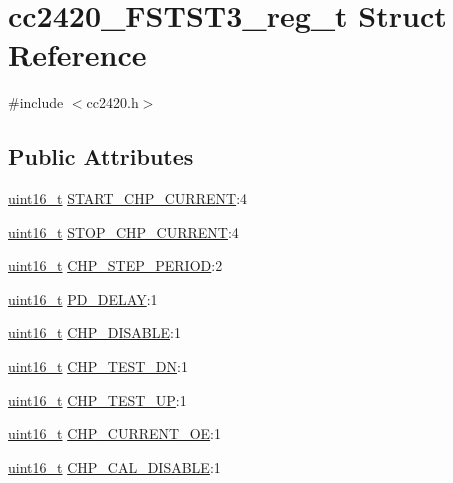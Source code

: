 \hypertarget{structcc2420___f_s_t_s_t3__reg__t}{}\section{cc2420\+\_\+\+F\+S\+T\+S\+T3\+\_\+reg\+\_\+t Struct Reference}
\label{structcc2420___f_s_t_s_t3__reg__t}


{\ttfamily \#include $<$cc2420.\+h$>$}

\subsection*{Public Attributes}
\begin{DoxyCompactItemize}
\item 
\hyperlink{_p_e___types_8h_a1f1825b69244eb3ad2c7165ddc99c956}{uint16\+\_\+t} \hyperlink{structcc2420___f_s_t_s_t3__reg__t_aacc2014359cac6b459cd9d53bcb2a39a}{S\+T\+A\+R\+T\+\_\+\+C\+H\+P\+\_\+\+C\+U\+R\+R\+E\+NT}\+:4
\item 
\hyperlink{_p_e___types_8h_a1f1825b69244eb3ad2c7165ddc99c956}{uint16\+\_\+t} \hyperlink{structcc2420___f_s_t_s_t3__reg__t_a9b22ea5d1fb50097de185de92d931339}{S\+T\+O\+P\+\_\+\+C\+H\+P\+\_\+\+C\+U\+R\+R\+E\+NT}\+:4
\item 
\hyperlink{_p_e___types_8h_a1f1825b69244eb3ad2c7165ddc99c956}{uint16\+\_\+t} \hyperlink{structcc2420___f_s_t_s_t3__reg__t_a1fb13f4ca07b823cd08a70675048283d}{C\+H\+P\+\_\+\+S\+T\+E\+P\+\_\+\+P\+E\+R\+I\+OD}\+:2
\item 
\hyperlink{_p_e___types_8h_a1f1825b69244eb3ad2c7165ddc99c956}{uint16\+\_\+t} \hyperlink{structcc2420___f_s_t_s_t3__reg__t_abbb7965c901c190b8f08bf77aa089d83}{P\+D\+\_\+\+D\+E\+L\+AY}\+:1
\item 
\hyperlink{_p_e___types_8h_a1f1825b69244eb3ad2c7165ddc99c956}{uint16\+\_\+t} \hyperlink{structcc2420___f_s_t_s_t3__reg__t_ac5259cac3f9179c91144ee8166cabcba}{C\+H\+P\+\_\+\+D\+I\+S\+A\+B\+LE}\+:1
\item 
\hyperlink{_p_e___types_8h_a1f1825b69244eb3ad2c7165ddc99c956}{uint16\+\_\+t} \hyperlink{structcc2420___f_s_t_s_t3__reg__t_a33e22f2f97a111e8d46cb47e094f62e8}{C\+H\+P\+\_\+\+T\+E\+S\+T\+\_\+\+DN}\+:1
\item 
\hyperlink{_p_e___types_8h_a1f1825b69244eb3ad2c7165ddc99c956}{uint16\+\_\+t} \hyperlink{structcc2420___f_s_t_s_t3__reg__t_a2af5ca644a0f0f0938200222ec9e6937}{C\+H\+P\+\_\+\+T\+E\+S\+T\+\_\+\+UP}\+:1
\item 
\hyperlink{_p_e___types_8h_a1f1825b69244eb3ad2c7165ddc99c956}{uint16\+\_\+t} \hyperlink{structcc2420___f_s_t_s_t3__reg__t_a9e73e16348b1f4ac4a595fe49a3a37de}{C\+H\+P\+\_\+\+C\+U\+R\+R\+E\+N\+T\+\_\+\+OE}\+:1
\item 
\hyperlink{_p_e___types_8h_a1f1825b69244eb3ad2c7165ddc99c956}{uint16\+\_\+t} \hyperlink{structcc2420___f_s_t_s_t3__reg__t_aa32822dc84b0e2153c4b6c14f60becd3}{C\+H\+P\+\_\+\+C\+A\+L\+\_\+\+D\+I\+S\+A\+B\+LE}\+:1
\end{DoxyCompactItemize}


